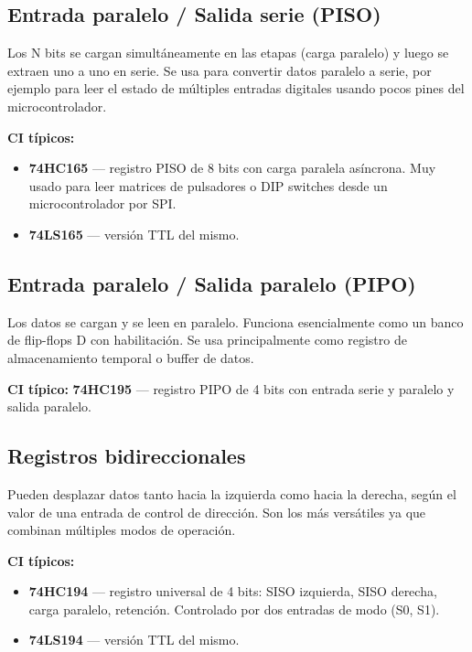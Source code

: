 
\subsection{Entrada paralelo / Salida serie (PISO)}

Los N bits se cargan simultáneamente en las etapas (carga paralelo) y luego se extraen uno a uno en serie. Se usa para convertir datos paralelo a serie, por ejemplo para leer el estado de múltiples entradas digitales usando pocos pines del microcontrolador.

\begin{notabox}
\textbf{CI típicos:}
\begin{itemize}
    \item \textbf{74HC165} --- registro PISO de 8 bits con carga paralela asíncrona. Muy usado para leer matrices de pulsadores o DIP switches desde un microcontrolador por SPI.
    \item \textbf{74LS165} --- versión TTL del mismo.
\end{itemize}
\end{notabox}

\subsection{Entrada paralelo / Salida paralelo (PIPO)}

Los datos se cargan y se leen en paralelo. Funciona esencialmente como un banco de flip-flops D con habilitación. Se usa principalmente como registro de almacenamiento temporal o buffer de datos.

\begin{notabox}
\textbf{CI típico:} \textbf{74HC195} --- registro PIPO de 4 bits con entrada serie y paralelo y salida paralelo.
\end{notabox}

\subsection{Registros bidireccionales}

Pueden desplazar datos tanto hacia la izquierda como hacia la derecha, según el valor de una entrada de control de dirección. Son los más versátiles ya que combinan múltiples modos de operación.

\begin{notabox}
\textbf{CI típicos:}
\begin{itemize}
    \item \textbf{74HC194} --- registro universal de 4 bits: SISO izquierda, SISO derecha, carga paralelo, retención. Controlado por dos entradas de modo (S0, S1).
    \item \textbf{74LS194} --- versión TTL del mismo.
\end{itemize}
\end{notabox}

